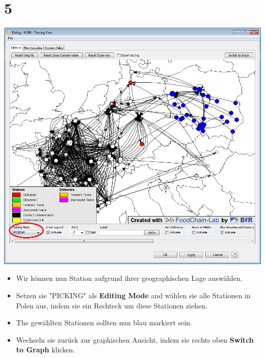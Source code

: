 \documentclass{beamer}
\begin{document}
\section{5}
\begin{frame}
	\begin{center}
  		\includegraphics[height=0.5\textheight]{5.png}
	\end{center}
	\begin{itemize}
		\item Wir können nun Station aufgrund ihrer geographischen Lage auswählen.
		\item Setzen sie "PICKING" als \textbf{Editing Mode} and wählen sie alle Stationen in Polen aus, indem sie ein Rechteck um diese Stationen ziehen.
		\item The gewählten Stationen sollten nun blau markiert sein.
		\item Wechseln sie zurück zur graphischen Ansicht, indem sie rechts oben \textbf{Switch to Graph} klicken.
	\end{itemize}
\end{frame}
\end{document}
